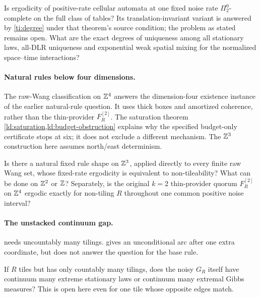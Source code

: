 \begin{problem}\label{prob:degree}
Is ergodicity of positive-rate cellular automata at one fixed noise rate $\Pi^0_2$-complete on the full class of tables? Its translation-invariant variant is answered by \cref{ti:degree} under that theorem's source condition; the problem as stated remains open. What are the exact degrees of uniqueness among all stationary laws, all-DLR uniqueness and exponential weak spatial mixing for the normalized space--time interactions?
\end{problem}

\paragraph{Natural rules below four dimensions.}
The raw-Wang classification on $\mathbb{Z}^4$ answers the dimension-four existence instance of the earlier natural-rule question. It uses thick boxes and amortized coherence, rather than the thin-provider $F_R^{[2]}$. The saturation theorem \cref{ld:saturation,ld:budget-obstruction} explains why the specified budget-only certificate stops at six; it does not exclude a different mechanism. The $\mathbb{Z}^3$ construction here assumes north/east determinism.

\begin{problem}\label{prob:natural}
Is there a natural fixed rule shape on $\mathbb{Z}^3$, applied directly to every finite raw Wang set, whose fixed-rate ergodicity is equivalent to non-tileability? What can be done on $\mathbb{Z}^2$ or $\mathbb{Z}$? Separately, is the original $k=2$ thin-provider quorum $F_R^{[2]}$ on $\mathbb{Z}^4$ ergodic exactly for non-tiling $R$ throughout one common positive noise interval?
\end{problem}

\paragraph{The unstacked continuum gap.}
 needs uncountably many tilings.  gives an unconditional arc after one extra coordinate, but does not answer the question for the base rule.

\begin{problem}\label{prob:countable}
If $R$ tiles but has only countably many tilings, does the noisy $G_R$ itself have continuum many extreme stationary laws or continuum many extremal Gibbs measures? This is open here even for one tile whose opposite edges match.
\end{problem}

